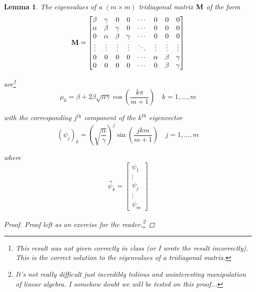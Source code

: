 \documentclass[12pt]{article}
\newtheorem{lemma}{Lemma}
\begin{document}
\begin{lemma} The eigenvalues of a $(m \times m)$ tridiagonal matrix ${\bf M}$ of the form
\begin{equation*}
	{\bf M} =
	\begin{bmatrix}
		\beta & \gamma & 0 & 0 & \cdots & 0 & 0 & 0 \\
		\alpha & \beta & \gamma & 0 & \cdots & 0 & 0 & 0 \\
		0 & \alpha & \beta & \gamma & \cdots & 0 & 0 & 0 \\
		\vdots & \vdots & \vdots & \vdots & \ddots & \vdots & \vdots & \vdots \\
		0 & 0 & 0 & 0 & \cdots & \alpha & \beta & \gamma \\
		0 & 0 & 0 & 0 & \cdots & 0 & \beta & \gamma 
	\end{bmatrix}
\end{equation*}

are\footnote{This result was not given correctly in class (or I wrote the result incorrectly). This is the correct solution to the eigenvalues of a tridiagonal matrix.}
\begin{equation*}
	\mu_k = \beta + 2\beta\sqrt{\alpha \gamma} \cos\left( \frac{ k\pi }{ m + 1 } \right) \quad k = 1, ... , m
\end{equation*}

with the corresponding $j^{\text{th}}$ component of the $k^{\text{th}}$ eigenvector
\begin{equation*}
	(\psi_j)_k = \left(\sqrt{ \frac{\alpha}{\gamma} }\right)^j \sin\left( \frac{ jkm }{ m + 1 }\right) \quad j = 1, ... , m
\end{equation*}

where
\begin{equation*}
	\vec{\psi}_k = 
	\begin{bmatrix}
		\psi_1 \\
		\vdots \\
		\psi_j \\
		\vdots \\
		\psi_m
	\end{bmatrix}
\end{equation*}
\begin{proof} Proof left as an exercise for the reader.\footnote{It's not really difficult just incredibly tedious and uninteresting manipulation of linear algebra. I somehow doubt we will be tested on this proof...}
\end{proof}
\end{lemma}
\end{document}

